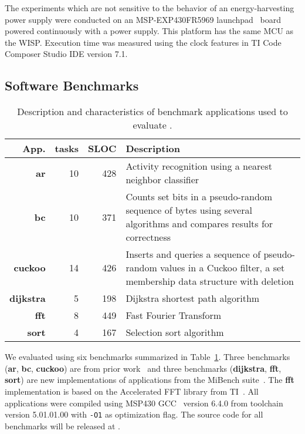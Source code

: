 The experiments which are not sensitive to the behavior of an
energy-harvesting power supply were conducted on an MSP-EXP430FR5969
launchpad~\cite{MSP-EXP430FR5969_launchpad} board powered continuously with a
power supply.
%
This platform has the same MCU as the WISP.
%
Execution time was measured using the clock features in TI Code
Composer Studio IDE version 7.1.
%

\subsection{Software Benchmarks}
\label{sec:software_benchmarks}

\begin{table}
	\centering
	\footnotesize
	\begin{tabular}{| r|r|r | p{} |}
		\hline
		App.&tasks&SLOC&Description\\
		\hline\hline
        \textbf{ar} &10 &428 & Activity recognition using a nearest neighbor
classifier\\ %
		\hline
        \textbf{bc} &10 &371 & Counts set bits in a pseudo-random sequence of bytes
using several algorithms and compares results for correctness\\
		\hline
        \textbf{cuckoo} &14 &426 & Inserts and queries a sequence of pseudo-random
values in a Cuckoo filter, a set membership data structure with deletion\\
		\hline
        \textbf{dijkstra} &5 &198 & Dijkstra shortest path algorithm \\
		\hline
        \textbf{fft} &8 &449 & Fast Fourier Transform\\ %
		\hline
		\textbf{sort} &4 &167 & Selection sort algorithm\\
		\hline
	\end{tabular}
\caption{Description and characteristics of benchmark applications used to
evaluate \sys.}
\label{table:benchmark_table}
\end{table}

We evaluated \sys using six benchmarks summarized in
Table~\ref{table:benchmark_table}. %
Three benchmarks (\textbf{ar}, \textbf{bc}, \textbf{cuckoo}) are from prior
work~\cite{chain,alpaca} and three benchmarks (\textbf{dijkstra},
\textbf{fft}, \textbf{sort}) are new implementations of applications
from the MiBench suite~\cite{mibench,hicks_mibench2_2016}. The
\textbf{fft} implementation is based on the Accelerated FFT library from
TI~\cite{ti_dsp}. All applications were compiled using MSP430 GCC~\cite{ti-gcc} version 6.4.0
from toolchain version 5.01.01.00 with \texttt{-O1} as optimization flag.
%
The source code for all benchmarks will be released at \cite{coala_website}.


